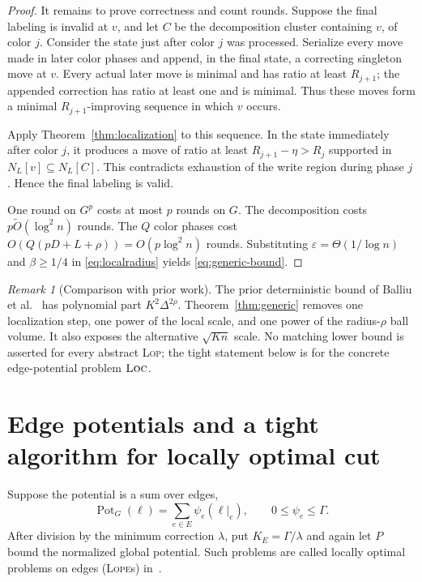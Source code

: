 \documentclass[11pt]{article}
\theoremstyle{definition}
\theoremstyle{remark}
\newtheorem{remark}[theorem]{Remark}
\newcommand{\Pot}{\operatorname{Pot}}
\newcommand{\eps}{\varepsilon}
\newcommand{\N}{N}
\newcommand{\LOC}{\textnormal{\textsc{Loc}}}
\newcommand{\LOP}{\textnormal{\textsc{Lop}}}
\newcommand{\LOPE}{\textnormal{\textsc{Lope}}}
\begin{document}
\begin{proof}
It remains to prove correctness and count rounds.  Suppose the final labeling is
invalid at $v$, and let $C$ be the decomposition cluster containing $v$, of color
$j$.  Consider the state just after color $j$ was processed.  Serialize every move
made in later color phases and append, in the final state, a correcting singleton
move at $v$.  Every actual later move is minimal and has ratio at least $R_{j+1}$;
the appended correction has ratio at least one and is minimal.  Thus these moves
form a minimal $R_{j+1}$-improving sequence in which $v$ occurs.

Apply Theorem~\ref{thm:localization} to this sequence.  In the state immediately
after color $j$, it produces a move of ratio at least
$R_{j+1}-\eta>R_j$ supported in $\N_L[v]\subseteq\N_L[C]$.  This contradicts
exhaustion of the write region during phase $j$.  Hence the final labeling is valid.

One round on $G^p$ costs at most $p$ rounds on $G$.  The decomposition costs
$p\widetilde O(\log^2 n)$ rounds.  The $Q$ color phases cost
$O(Q(pD+L+\rho))=O(p\log^2 n)$ rounds.  Substituting $\eps=\Theta(1/\log n)$ and
$\beta\geq1/4$ in \eqref{eq:localradius} yields \eqref{eq:generic-bound}.
\end{proof}

\begin{remark}[Comparison with prior work]
The prior deterministic bound of Balliu et al.~\cite{BalliuEtAl2026} has polynomial
part $K^2\Delta^{2\rho}$.  Theorem~\ref{thm:generic} removes one localization step,
one power of the local scale, and one power of the radius-$\rho$ ball volume.  It also
exposes the alternative $\sqrt{Kn}$ scale.  No matching lower bound is asserted for
every abstract \LOP; the tight statement below is for the concrete edge-potential
problem $\LOC$.
\end{remark}

\section{Edge potentials and a tight algorithm for locally optimal cut}

Suppose the potential is a sum over edges,
\[
 \Pot_G(\ell)=\sum_{e\in E}\psi_e(\ell|_e),
 \qquad 0\leq\psi_e\leq\Gamma.
\]
After division by the minimum correction $\lambda$, put $K_E=\Gamma/\lambda$ and
again let $P$ bound the normalized global potential.  Such problems are called
locally optimal problems on edges (\LOPE s) in~\cite{BalliuEtAl2026}.
\end{document}
